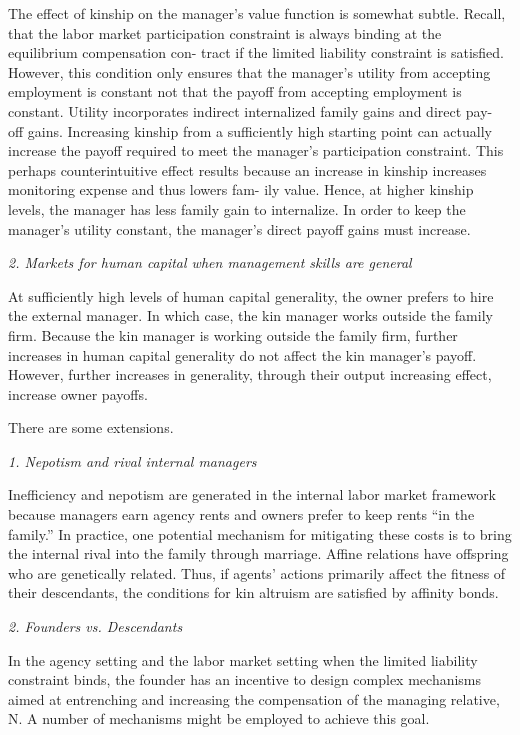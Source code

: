 \documentclass{article}
\begin{document}
    The effect of kinship on the manager’s value function is somewhat subtle. Recall, that the labor market participation constraint is always binding at the equilibrium compensation con- tract if the limited liability constraint is satisfied. However, this condition only ensures that the manager’s utility from accepting employment is constant not that the payoff from accepting employment is constant. Utility incorporates indirect internalized family gains and direct pay- off gains. Increasing kinship from a sufficiently high starting point can actually increase the payoff required to meet the manager’s participation constraint. This perhaps counterintuitive effect results because an increase in kinship increases monitoring expense and thus lowers fam- ily value. Hence, at higher kinship levels, the manager has less family gain to internalize. In order to keep the manager’s utility constant, the manager’s direct payoff gains must increase.
    
    \emph{2. Markets for human capital when management skills are general}
    
    At sufficiently high levels of human capital generality, the owner prefers to 
    hire the external manager. In which case, the kin manager works outside the family firm. Because the kin manager 
    is working outside the family firm, further increases in human capital generality do not affect the kin manager’s payoff. 
    However, further increases in generality, through their output increasing effect, increase owner payoffs.
    
    There are some extensions.

    \emph{1. Nepotism and rival internal managers}

    Inefficiency and nepotism are generated in the internal labor market framework because managers earn agency rents and owners prefer to keep rents “in the family.” In practice, one potential mechanism for mitigating these costs is to bring the internal rival into the family through marriage. Affine relations have offspring who are genetically related. Thus, if agents’ actions primarily affect the fitness of their descendants, the conditions for kin altruism are satisfied by affinity bonds.

    \emph{2. Founders vs. Descendants}

    In the agency setting and the labor market setting when the limited liability constraint binds, the founder has an incentive to design complex 
    mechanisms aimed at entrenching and increasing the compensation of the managing relative, N. A number of mechanisms might be employed to achieve this goal.
\end{document}
